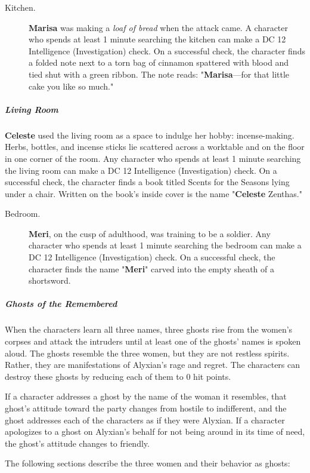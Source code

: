\documentclass[10pt,a4paper,twoside,fancy,bg=print,twocolumn,openany,nodeprecatedcode]{dndbook}
\begin{document}
\begin{description}
\item[Kitchen.]
\textbf{Marisa} was making a \textit{loaf of bread} when the attack came. A character who spends at least 1 minute searching the kitchen can make a DC 12 Intelligence (Investigation) check. On a successful check, the character finds a folded note next to a torn bag of cinnamon spattered with blood and tied shut with a green ribbon. The note reads: "\textbf{Marisa}—for that little cake you like so much."
\end{description}

\subparagraph{Living Room}
\textbf{Celeste} used the living room as a space to indulge her hobby: incense-making. Herbs, bottles, and incense sticks lie scattered across a worktable and on the floor in one corner of the room. Any character who spends at least 1 minute searching the living room can make a DC 12 Intelligence (Investigation) check. On a successful check, the character finds a book titled Scents for the Seasons lying under a chair. Written on the book's inside cover is the name "\textbf{Celeste} Zenthas."


\begin{description}
\item[Bedroom.]
\textbf{Meri}, on the cusp of adulthood, was training to be a soldier. Any character who spends at least 1 minute searching the bedroom can make a DC 12 Intelligence (Investigation) check. On a successful check, the character finds the name "\textbf{Meri}" carved into the empty sheath of a shortsword.
\end{description}

\subparagraph{Ghosts of the Remembered}
When the characters learn all three names, three ghosts rise from the women's corpses and attack the intruders until at least one of the ghosts' names is spoken aloud. The ghosts resemble the three women, but they are not restless spirits. Rather, they are manifestations of Alyxian's rage and regret. The characters can destroy these ghosts by reducing each of them to 0 hit points.

If a character addresses a ghost by the name of the woman it resembles, that ghost's attitude toward the party changes from hostile to indifferent, and the ghost addresses each of the characters as if they were Alyxian. If a character apologizes to a ghost on Alyxian's behalf for not being around in its time of need, the ghost's attitude changes to friendly.

The following sections describe the three women and their behavior as ghosts:
\end{document}

